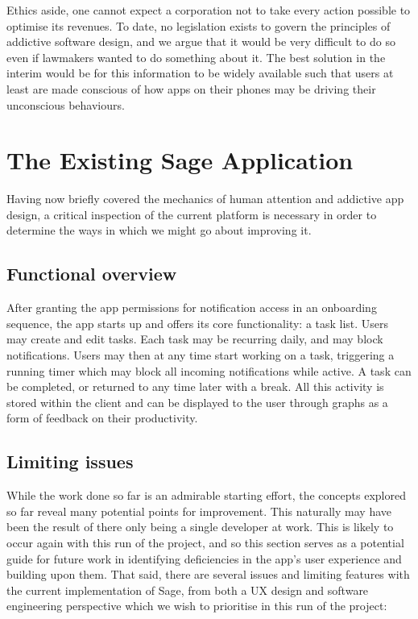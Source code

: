 Ethics aside, one cannot expect a corporation not to take every action possible to optimise its revenues. To date, no legislation exists to govern the principles of addictive software design, and we argue that it would be very difficult to do so even if lawmakers wanted to do something about it. The best solution in the interim would be for this information to be widely available such that users at least are made conscious of how apps on their phones may be driving their unconscious behaviours.

\section{The Existing Sage Application}
Having now briefly covered the mechanics of human attention and addictive app design, a critical inspection of the current platform is necessary in order to determine the ways in which we might go about improving it.

\subsection{Functional overview}
After granting the app permissions for notification access in an onboarding sequence, the app starts up and offers its core functionality: a task list. Users may create and edit tasks. Each task may be recurring daily, and may block notifications. Users may then at any time start working on a task, triggering a running timer which may block all incoming notifications while active. A task can be completed, or returned to any time later with a break. All this activity is stored within the client and can be displayed to the user through graphs as a form of feedback on their productivity.

\subsection{Limiting issues}
While the work done so far is an admirable starting effort, the concepts explored so far reveal many potential points for improvement. This naturally may have been the result of there only being a single developer at work. This is likely to occur again with this run of the project, and so this section serves as a potential guide for future work in identifying deficiencies in the app's user experience and building upon them. That said, there are several issues and limiting features with the current implementation of Sage, from both a UX design and software engineering perspective which we wish to prioritise in this run of the project:

